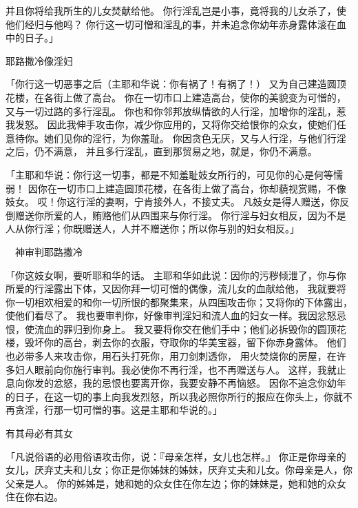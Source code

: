 {并且你将给我所生的儿女焚献给他。
你行淫乱岂是小事，竟将我的儿女杀了，使他们经{}归与他吗？
你行这一切可憎和淫乱的事，并未追念你幼年赤身露体滚在血中的日子。」
\par }{\SH 耶路撒冷像淫妇
\par }{\PP {}「你行这一切恶事之后（主耶和华说：你有祸了！有祸了！）
又为自己建造圆顶花楼，在各街上做了高台。
你在一切市口上建造高台，使你的美貌变为可憎的，又与一切过路的多行淫乱。
你也和你邻邦放纵情欲的{}人行淫，加增你的淫乱，惹我发怒。
因此我伸手攻击你，减少你应用的{}，又将你交给恨你的{}众女，使她们任意待你。她们见你的淫行，为你羞耻。
你因贪色无厌，又与{}人行淫，与他们行淫之后，仍不满意，
并且多行淫乱，直到那贸易之地，就是{}，你仍不满意。
\par }{\PP {}「主耶和华说：你行这一切事，都是不知羞耻妓女所行的，可见你的心是何等懦弱！
因你在一切市口上建造圆顶花楼，在各街上做了高台，你却藐视赏赐，不像妓女。
哎！你这行淫的妻啊，宁肯接外人，不接丈夫。
凡妓女是得人赠送，你反倒赠送你所爱的人，贿赂他们从四围来与你行淫。
你行淫与{}妇女相反，因为不是人从你行淫；你既赠送人，人并不赠送你；所以你与别的妇女相反。」
\par }{\SH 　神审判耶路撒冷
\par }{\PP {}「你这妓女啊，要听耶和华的话。
主耶和华如此说：因你的污秽倾泄了，你与你所爱的行淫露出下体，又因你拜一切可憎的偶像，流儿女的血献给他，
我就要将你一切相欢相爱的和你一切所恨的都聚集来，从四围攻击你；又将你的下体露出，使他们看尽了。
我也要审判你，好像{}审判淫妇和流人血的妇女一样。我因忿怒忌恨，使流血的罪归到你身上。
我又要将你交在他们手中；他们必拆毁你的圆顶花楼，毁坏你的高台，剥去你的衣服，夺取你的华美宝器，留下你赤身露体。
他们也必带多人来攻击你，用石头打死你，用刀剑刺透你，
用火焚烧你的房屋，在许多妇人眼前向你施行审判。我必使你不再行淫，也不再赠送与人。
这样，我就止息向你发的忿怒，我的忌恨也要离开你，我要安静不再恼怒。
因你不追念你幼年的日子，在这一切的事上向我发烈怒，所以我必照你所行的报应在你头上，你就不再贪淫，行那一切可憎的事。这是主耶和华说的。」
\par }{\SH 有其母必有其女
\par }{\PP {}「凡说俗语的必用俗语攻击你，说：『母亲怎样，女儿也怎样。』
你正是你母亲的女儿，厌弃丈夫和儿女；你正是你姊妹的姊妹，厌弃丈夫和儿女。你母亲是{}人，你父亲是{}人。
你的姊姊是{}，她和她的众女住在你左边；你的妹妹是{}，她和她的众女住在你右边。
}
